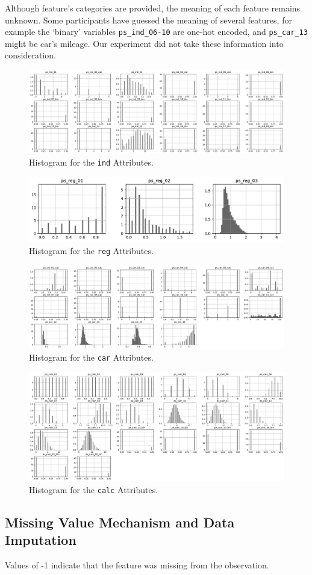 \documentclass{standalone}
\begin{document}
Although feature's categories are provided, the meaning of each feature remains unknown. Some participants have guessed the meaning of several features, for example the `binary' variables  \lstinline{ps_ind_06-10} are one-hot encoded, and \lstinline{ps_car_13} might be car's mileage.
Our experiment did not take these information into consideration.

\begin{figure}[!t]
\centering
\includegraphics[width=\textwidth]{fig/ind_col.pdf}
\caption{Histogram for the \lstinline{ind} Attributes.}
\label{fig_ind}
\end{figure}

\begin{figure}[!t]
\centering
\includegraphics[width=.5\textwidth]{fig/reg_col.pdf}
\caption{Histogram for the \lstinline{reg} Attributes.}
\label{fig_reg}
\end{figure}

\begin{figure}[!t]
\centering
\includegraphics[width=\textwidth]{fig/car_col.pdf}
\caption{Histogram for the \lstinline{car} Attributes.}
\label{fig_car}
\end{figure}

\begin{figure}[!t]
\centering
\includegraphics[width=\textwidth]{fig/calc_col.pdf}
\caption{Histogram for the \lstinline{calc} Attributes.}
\label{fig_calc}
\end{figure}

\subsection{Missing Value Mechanism and Data Imputation}

Values of -1 indicate that the feature was missing from
the observation.
\end{document}
